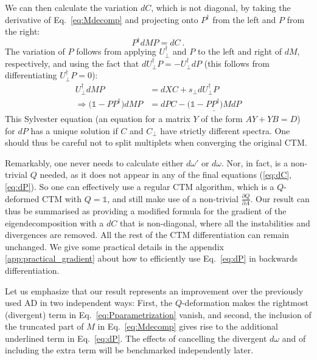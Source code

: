 \documentclass[twocolumn,floatfix,superscriptaddress,longbibliography,pra]{revtex4-2}
\begin{document}
We can then calculate the variation $dC$, which is not diagonal, by taking the derivative of Eq.~\eqref{eq:Mdecomp} and projecting onto $P^\dagger$ from the left and $P$ from the right:
\begin{equation}
    P^\dagger dM P=dC\ .
    \label{eq:dC}
\end{equation}
The variation of $P$ follows from applying $U_\perp^\dagger$ and $P$ to the left and right of $dM$, respectively, and using the fact that $dU^\dagger_\perp P= - U^\dagger_\perp dP$ (this follows from differentiating $U^\dagger_\perp P = 0$):
\begin{align}
    U_\perp^\dagger dM P&=dX C + s_\perp dU^\dagger_\perp P\\
    \Rightarrow\big(\mathbb{1}-PP^\dagger\big)dMP&=dPC-\underline{\big(\mathbb{1}-PP^\dagger\big)MdP}
    \label{eq:dP}
\end{align}
This Sylvester equation (an equation for a matrix $Y$ of the form $A Y + YB = D$) for $dP$ has a unique solution if $C$ and $C_\perp$ have strictly different spectra. One should thus be careful not to split multiplets when converging the original CTM.

Remarkably, one never needs to calculate either $d\omega'$ or $d\omega$. Nor, in fact, is a non-trivial $Q$ needed, as it does not appear in any of the final equations (\ref{eq:dC},\ref{eq:dP}). So one can effectively use a regular CTM algorithm, which is a $Q$-deformed CTM with $Q=\mathbb{1}$, and still make use of a non-trivial $\frac{\partial Q}{\partial A}$. Our result can thus be summarised as providing a modified formula for the gradient of the eigendecomposition with a $dC$ that is non-diagonal, where all the instabilities and divergences are removed. All the rest of the CTM differentiation can remain unchanged. We give some practical details in the appendix \ref{app:practical_gradient} about how to efficiently use Eq.~\eqref{eq:dP} in backwards differentiation.

Let us emphasize that our result represents an improvement over the previously used AD in two independent ways: First, the $Q$-deformation makes the rightmost (divergent) term in Eq.~\eqref{eq:Pparametrization} vanish, and second, the inclusion of the truncated part of $M$ in Eq.~\eqref{eq:Mdecomp} gives rise to the additional underlined term in Eq.~\eqref{eq:dP}.
The effects  of cancelling the divergent $d\omega$ and of including the extra term  will be benchmarked independently later.
\end{document}
